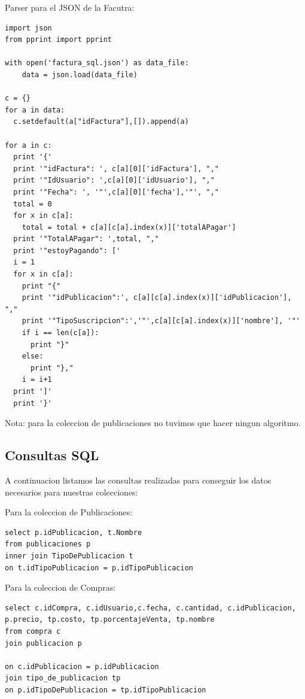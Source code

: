 \documentclass[a4paper, 10pt, twoside]{article}
\begin{document}
Parser para el JSON de la Facutra:

\begin{verbatim}
import json
from pprint import pprint

with open('factura_sql.json') as data_file:    
    data = json.load(data_file)

c = {}
for a in data:
  c.setdefault(a["idFactura"],[]).append(a)

for a in c:
  print '{'
  print '"idFactura": ', c[a][0]['idFactura'], ","
  print '"IdUsuario": ',c[a][0]['idUsuario'], ","
  print '"Fecha": ', '"',c[a][0]['fecha'],'"', ","
  total = 0
  for x in c[a]:
    total = total + c[a][c[a].index(x)]['totalAPagar']
  print '"TotalAPagar": ',total, ","
  print '"estoyPagando": ['
  i = 1
  for x in c[a]:
    print "{"
    print '"idPublicacion":', c[a][c[a].index(x)]['idPublicacion'], ","
    print '"TipoSuscripcion":','"',c[a][c[a].index(x)]['nombre'], '"'
    if i == len(c[a]):
      print "}"
    else:
      print "},"
    i = i+1
  print ']'
  print '}'

\end{verbatim}

Nota: para la coleccion de publicaciones no tuvimos que hacer ningun algoritmo.


\subsection{Consultas SQL}

A continuacion listamos las consultas realizadas para conseguir los datos necesarios para nuestras colecciones:

Para la coleccion de Publicaciones:

\begin{verbatim}
select p.idPublicacion, t.Nombre
from publicaciones p
inner join TipoDePublicacion t
on t.idTipoPublicacion = p.idTipoPublicacion
\end{verbatim}

Para la coleccion de Compras:

\begin{verbatim}
select c.idCompra, c.idUsuario,c.fecha, c.cantidad, c.idPublicacion, p.precio, tp.costo, tp.porcentajeVenta, tp.nombre  
from compra c 
join publicacion p
 
on c.idPublicacion = p.idPublicacion
join tipo_de_publicacion tp
on p.idTipoDePublicacion = tp.idTipoPublicacion

\end{verbatim}
\end{document}
